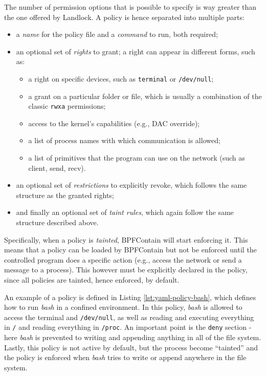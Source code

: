 The number of permission options that is possible to specify is way greater than the one offered by Landlock.
A policy is hence separated into multiple parts:
\begin{itemize}
  \item a \textit{name} for the policy file and a \textit{command} to run, both required;
  \item an optional set of \textit{rights} to grant; a right can appear in different forms, such as:
        \begin{itemize}
          \item a right on specific devices, such as \texttt{terminal} or \texttt{/dev/null};
          \item a grant on a particular folder or file, which is usually a combination of the classic \texttt{rwxa} permissions;
          \item access to the kernel's capabilities (e.g., DAC override);
          \item a list of process names with which communication is allowed;
          \item a list of primitives that the program can use on the network (such as client, send, recv).
        \end{itemize}
  \item an optional set of \textit{restrictions} to explicitly revoke, which follows the same structure as the
        granted rights;
  \item and finally an optional set of \textit{taint rules}, which again follow the same structure described above.
\end{itemize}

Specifically, when a policy is \textit{tainted}, BPFContain will start enforcing it. This means that a policy
can be loaded by BPFContain but not be enforced until the controlled program does a specific
action (e.g., access the network or send a message to a process).
This however must be explicitly declared in the policy, since all policies are tainted, hence enforced, by default.

An example of a policy is defined in Listing \ref{lst:yaml-policy-bash}, which defines how to
run \textit{bash} in a confined environment.
In this policy, \textit{bash} is allowed to access the terminal and \texttt{/dev/null}, as well
as reading and executing everything in \texttt{/} and reading everything in \texttt{/proc}.
An important point is the \texttt{deny} section - here \textit{bash} is prevented to writing and
appending anything in all of the file system.
Lastly, this policy is not active by default, but the process become ``tainted'' and the policy is enforced
when \textit{bash} tries to write or append anywhere in the file system.

